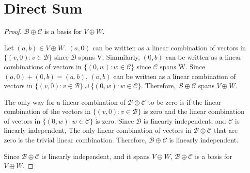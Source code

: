 \section{Direct Sum}

\begin{proof} $\mathcal{B} \oplus \mathcal{C}$ is a basis for $V \oplus W$.\gap

    Let $(a,b) \in V \oplus W$. 
    $(a,0)$ can be written as a linear combination
    of vectors in $\{(v,0) : v \in \mathcal{B}\}$ 
    since $\mathcal{B}$ spans V.
    Simmilarly, $(0,b)$ can be written as a linear combinations 
    of vectors in $\{(0,w) : w \in \mathcal{C}\}$ 
    since $\mathcal{C}$ spans W.
    Since $(a,0) + (0,b) = (a,b)$, 
    $(a,b)$ can be written as a linear combination of vectors in
    $\{(v,0) : v \in \mathcal{B}\} \cup \{(0,w) : w \in \mathcal{C}\}$.
    Therefore, $\mathcal{B} \oplus \mathcal{C}$ spans $V \oplus W$.\gap

    
    The only way for a linear combination of $\mathcal{B} \oplus \mathcal{C}$
    to be zero is if the linear combination of the vectors in 
    $\{(v,0) : v \in \mathcal{B}\}$ is zero 
    and the linear combination of vectors in 
    $\{(0,w) : w \in \mathcal{C}\}$ is zero.
    Since $\mathcal{B}$ is linearly independent, 
    and $\mathcal{C}$ is linearly independent,
    The only linear combination of vectors in $\mathcal{B} \oplus \mathcal{C}$ 
    that are zero is the trivial linear combination.
    Therefore, $\mathcal{B} \oplus \mathcal{C}$  is linearly independent.\gap

    Since $\mathcal{B} \oplus \mathcal{C}$ is linearly independent,
    and it spans $V \oplus W$,
    $\mathcal{B} \oplus \mathcal{C}$ is a basis for $V \oplus W$.
\end{proof}